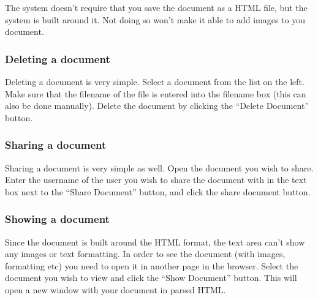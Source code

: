 \documentclass[11pt,a4paper]{article}
\begin{document}
    The system doesn't require that you save the document as a HTML file, but the system is built around it. Not 
    doing so won't make it able to add images to you document.
\subsubsection{Deleting a document}
\label{sec-1-2-2}

    Deleting a document is very simple.
    Select a document from the list on the left. Make sure that the filename of the file is entered into the 
    filename box (this can also be done manually). Delete the document by clicking the ``Delete Document'' button.
\subsubsection{Sharing a document}
\label{sec-1-2-3}

    Sharing a document is very simple as well.
    Open the document you wish to share. Enter the username of the user you wish to share the document with in
    the text box next to the ``Share Document'' button, and click the share document button.
\subsubsection{Showing a document}
\label{sec-1-2-4}

    Since the document is built around the HTML format, the text area can't show any images or text formatting.
    In order to see the document (with images, formatting etc) you need to open it in another page in the 
    browser.
    Select the document you wish to view and click the ``Show Document'' button. This will open a new window 
    with your document in parsed HTML.
\end{document}
